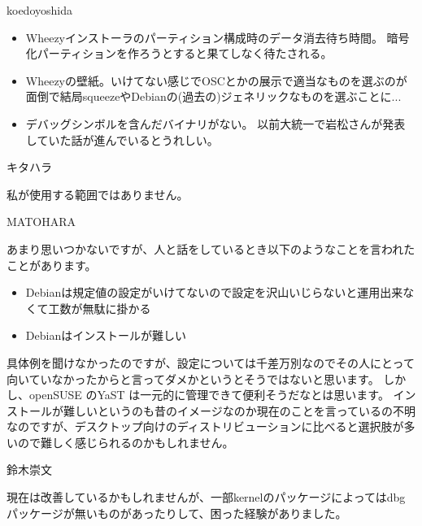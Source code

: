 %

\begin{prework}{ koedoyoshida }

\begin{itemize}
 \item Wheezyインストーラのパーティション構成時のデータ消去待ち時間。
 暗号化パーティションを作ろうとすると果てしなく待たされる。
 \item 
 Wheezyの壁紙。いけてない感じでOSCとかの展示で適当なものを選ぶのが面倒で結局squeezeやDebianの(過去の)ジェネリックなものを選ぶことに...
 \item 
 デバッグシンボルを含んだバイナリがない。
 以前大統一で岩松さんが発表していた話が進んでいるとうれしい。
\end{itemize}

\end{prework}

\begin{prework}{ キタハラ }

私が使用する範囲ではありません。

\end{prework}

\begin{prework}{ MATOHARA }

あまり思いつかないですが、人と話をしているとき以下のようなことを言われたことがあります。
\begin{itemize}
 \item 
 Debianは規定値の設定がいけてないので設定を沢山いじらないと運用出来なくて工数が無駄に掛かる
 \item 
 Debianはインストールが難しい
\end{itemize}
具体例を聞けなかったのですが、設定については千差万別なのでその人にとって
 向いていなかったからと言ってダメかというとそうではないと思います。
しかし、openSUSE のYaST は一元的に管理できて便利そうだなとは思います。
インストールが難しいというのも昔のイメージなのか現在のことを言っているの不明なのですが、デスクトップ向けのディストリビューションに比べると選択肢が多いので難しく感じられるのかもしれません。

\end{prework}

\begin{prework}{ 鈴木崇文 }

現在は改善しているかもしれませんが、一部kernelのパッケージによってはdbgパッケージが無いものがあったりして、困った経験がありました。
\end{prework}

